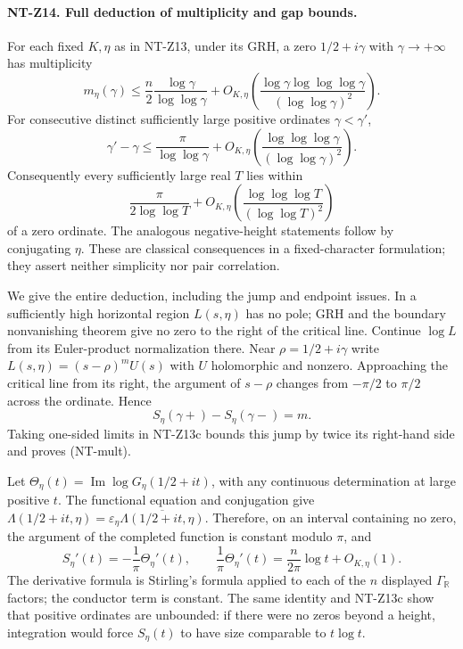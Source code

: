 \paragraph{NT-Z14. Full deduction of multiplicity and gap bounds.}
For each fixed $K,\eta$ as in NT-Z13, under its GRH, a zero
$1/2+i\gamma$ with $\gamma\to+\infty$ has multiplicity
\[
 m_\eta(\gamma)\le\frac n2\frac{\log\gamma}{\log\log\gamma}
   +O_{K,\eta}\left(
    \frac{\log\gamma\log\log\log\gamma}{(\log\log\gamma)^2}\right).
\tag{NT-mult}
\]
For consecutive distinct sufficiently large positive ordinates
$\gamma<\gamma'$,
\[
 \gamma'-\gamma\le\frac{\pi}{\log\log\gamma}
   +O_{K,\eta}\left(
    \frac{\log\log\log\gamma}{(\log\log\gamma)^2}\right).
\tag{NT-gap}
\]
Consequently every sufficiently large real $T$ lies within
\[
 \frac{\pi}{2\log\log T}
 +O_{K,\eta}\left(\frac{\log\log\log T}{(\log\log T)^2}\right)
\]
of a zero ordinate.  The analogous
negative-height statements follow by conjugating $\eta$.  These are
classical consequences in a fixed-character formulation; they assert
neither simplicity nor pair correlation.

We give the entire deduction, including the jump and endpoint issues.
In a sufficiently high horizontal region $L(s,\eta)$ has no pole;
GRH and the boundary nonvanishing theorem give no zero to the right
of the critical line.  Continue $\log L$ from its Euler-product
normalization there.  Near $\rho=1/2+i\gamma$ write
$L(s,\eta)=(s-\rho)^m U(s)$ with $U$ holomorphic and nonzero.
Approaching the critical line from its right, the argument of
$s-\rho$ changes from $-\pi/2$ to $\pi/2$ across the ordinate.
Hence
\[
 S_\eta(\gamma+)-S_\eta(\gamma-)=m.
\]
Taking one-sided limits in NT-Z13c bounds this jump by twice its
right-hand side and proves (NT-mult).

Let $\Theta_\eta(t)=\operatorname{Im}\log G_\eta(1/2+it)$, with
any continuous determination at large positive $t$.
The functional equation and conjugation give
$\Lambda(1/2+it,\eta)=\varepsilon_\eta
\overline{\Lambda(1/2+it,\eta)}$.
Therefore, on an interval containing no zero, the argument of the
completed function is constant modulo $\pi$, and
\[
 S_\eta'(t)=-\frac1\pi\Theta_\eta'(t),\qquad
 \frac1\pi\Theta_\eta'(t)
    =\frac n{2\pi}\log t+O_{K,\eta}(1).
\tag{NT-phase}
\]
The derivative formula is Stirling's formula applied to each of the
$n$ displayed $\Gamma_{\mathbb R}$ factors; the conductor term is
constant.  The same identity and NT-Z13c show that positive ordinates
are unbounded: if there were no zeros beyond a height, integration
would force $S_\eta(t)$ to have size comparable to $t\log t$.

